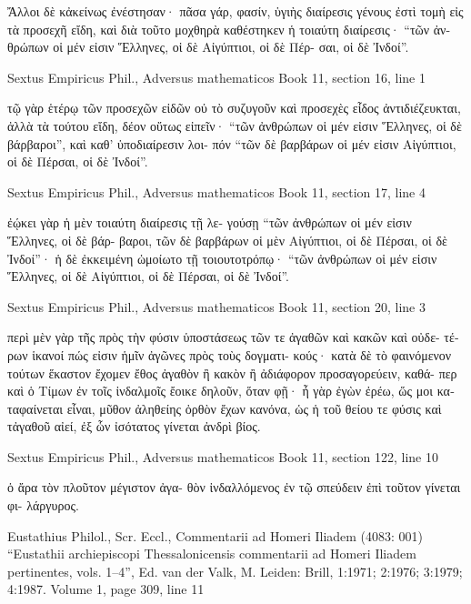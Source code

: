 \documentclass[12pt,letterpaper,twoside,final]{memoir}
\begin{document}
\begin{greek}
Ἄλλοι δὲ κἀκείνως ἐνέστησαν· πᾶσα γάρ, φασίν, ὑγιὴς 
διαίρεσις γένους ἐστὶ τομὴ εἰς τὰ προσεχῆ εἴδη, καὶ διὰ 
τοῦτο μοχθηρὰ καθέστηκεν ἡ τοιαύτη διαίρεσις· “τῶν ἀν-
θρώπων οἱ μέν εἰσιν Ἕλληνες, οἱ δὲ Αἰγύπτιοι, οἱ δὲ Πέρ-
σαι, οἱ δὲ Ἰνδοί”. 



Sextus Empiricus Phil., Adversus mathematicos 
Book 11, section 16, line 1

                        τῷ γὰρ ἑτέρῳ τῶν προσεχῶν εἰδῶν οὐ 
τὸ συζυγοῦν καὶ προσεχὲς εἶδος ἀντιδιέζευκται, ἀλλὰ τὰ 
τούτου εἴδη, δέον οὕτως εἰπεῖν· “τῶν ἀνθρώπων οἱ μέν 
εἰσιν Ἕλληνες, οἱ δὲ βάρβαροι”, καὶ καθ' ὑποδιαίρεσιν λοι-
πόν “τῶν δὲ βαρβάρων οἱ μέν εἰσιν Αἰγύπτιοι, οἱ δὲ Πέρσαι, 
οἱ δὲ Ἰνδοί”. 



Sextus Empiricus Phil., Adversus mathematicos 
Book 11, section 17, line 4

                ἐῴκει γὰρ ἡ μὲν τοιαύτη διαίρεσις τῇ λε-
γούσῃ “τῶν ἀνθρώπων οἱ μέν εἰσιν Ἕλληνες, οἱ δὲ βάρ-
βαροι, τῶν δὲ βαρβάρων οἱ μὲν Αἰγύπτιοι, οἱ δὲ Πέρσαι, 
οἱ δὲ Ἰνδοί”· ἡ δὲ ἐκκειμένη ὡμοίωτο τῇ τοιουτοτρόπῳ· 
“τῶν ἀνθρώπων οἱ μέν εἰσιν Ἕλληνες, οἱ δὲ Αἰγύπτιοι, οἱ 
δὲ Πέρσαι, οἱ δὲ Ἰνδοί”. 



Sextus Empiricus Phil., Adversus mathematicos 
Book 11, section 20, line 3

                                  περὶ μὲν γὰρ τῆς πρὸς τὴν 
φύσιν ὑποστάσεως τῶν τε ἀγαθῶν καὶ κακῶν καὶ οὐδε-
τέρων ἱκανοί πώς εἰσιν ἡμῖν ἀγῶνες πρὸς τοὺς δογματι-
κούς· κατὰ δὲ τὸ φαινόμενον τούτων ἕκαστον ἔχομεν 
ἔθος ἀγαθὸν ἢ κακὸν ἢ ἀδιάφορον προσαγορεύειν, καθά-
περ καὶ ὁ Τίμων ἐν τοῖς ἰνδαλμοῖς ἔοικε 
δηλοῦν, ὅταν φῇ· 
  ἦ γὰρ ἐγὼν ἐρέω, ὥς μοι καταφαίνεται εἶναι, 
  μῦθον ἀληθείης ὀρθὸν ἔχων κανόνα, 
  ὡς ἡ τοῦ θείου τε φύσις καὶ τἀγαθοῦ αἰεί, 
  ἐξ ὧν ἰσότατος γίνεται ἀνδρὶ βίος. 



Sextus Empiricus Phil., Adversus mathematicos 
Book 11, section 122, line 10

                         ὁ ἄρα τὸν πλοῦτον μέγιστον ἀγα-
θὸν ἰνδαλλόμενος ἐν τῷ σπεύδειν ἐπὶ τοῦτον γίνεται φι-
λάργυρος. 



Eustathius Philol., Scr. Eccl., Commentarii ad Homeri Iliadem (4083: 001)
“Eustathii archiepiscopi Thessalonicensis commentarii ad Homeri Iliadem pertinentes, vols. 1–4”, Ed. van der Valk, M.
Leiden: Brill, 1:1971; 2:1976; 3:1979; 4:1987.
Volume 1, page 309, line 11


\end{greek}
\end{document}
